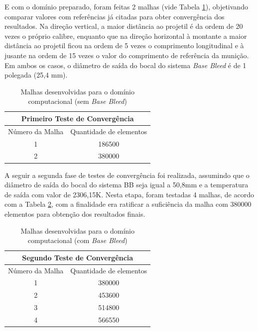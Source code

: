 E com o domínio preparado, foram feitas 2 malhas (vide Tabela \ref{tab:tabela-malhas-inicial}), objetivando comparar valores com referências já citadas \cite{Mahmoud2009} para obter convergência dos resultados. Na direção vertical, a maior distância ao projetil é da ordem de 20 vezes o próprio calibre, enquanto que na direção horizontal à montante a maior distância ao projetil ficou na ordem de 5 vezes o comprimento longitudinal e à jusante na ordem de 15 vezes o valor do comprimento de referência da munição. Em ambos os casos, o diâmetro de saída do bocal do sistema \textit{Base Bleed} é de 1 polegada (25,4 mm).

\begin{table}[ht]
\centering
\caption[Malhas desenvolvidas para o domínio computacional (sem \textit{Base Bleed})]{Malhas desenvolvidas para o domínio computacional (sem \textit{Base Bleed})}
\vspace{0.5cm}
\begin{tabular}{c|c}
\multicolumn{2}{c}{Primeiro Teste de Convergência} \\
\hline 
Número da Malha & Quantidade de elementos \\ 
\hline
1 & 186500 \\
2 & 380000
\end{tabular}
\label{tab:tabela-malhas-inicial}
\end{table}

A seguir a segunda fase de testes de convergência foi realizada, assumindo que o diâmetro de saída do bocal do sistema BB seja igual a 50,8mm e a temperatura de saída com valor de 2306,15K. Nesta etapa, foram testadas 4 malhas, de acordo com a Tabela \ref{tab:tabela-malhas-secundaria}, com a finalidade era ratificar a suficiência da malha com 380000 elementos para obtenção dos resultados finais.

\begin{table}[ht]
\centering
\caption[Malhas desenvolvidas para o domínio computacional (com \textit{Base Bleed})]{Malhas desenvolvidas para o domínio computacional (com \textit{Base Bleed})}
\vspace{0.5cm}
\begin{tabular}{c|c}
\multicolumn{2}{c}{Segundo Teste de Convergência} \\
\hline 
Número da Malha & Quantidade de elementos \\ 
\hline
1 & 380000 \\
2 & 453600 \\
3 & 514800 \\
4 & 566550
\end{tabular}
\label{tab:tabela-malhas-secundaria}
\end{table}

